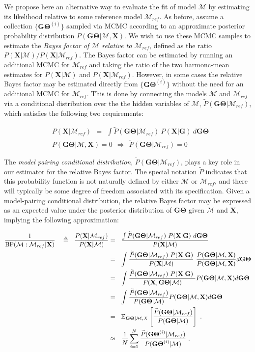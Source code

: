 \documentclass[11pt]{article}
\newcommand{\vect}[1]{\boldsymbol{\mathbf{#1}}}
\newcommand{\E}{\mathbb{E}}
\newcommand{\X}{\vect{X}}
\newcommand{\M}{\mathcal{M}}
\newcommand{\G}{\vect{G}}
\newcommand{\T}{\vect{\Theta}}
\newcommand{\GT}{\G\T}
\newcommand{\Mref}{\M_{ref}}
\newcommand{\Pref}{\widetilde{P}}
\newcommand{\rbf}{\text{BF}}
\newcommand{\1}{\mathbbm{1}}
\begin{document}
We propose here an alternative way to evaluate the fit of model $\M$ by estimating its likelihood relative to some
reference model $\Mref$. 
%
As before, assume a collection $\{\GT^{(i)}\}$ sampled via MCMC according to an approximate posterior probability distribution $P(\GT|\M,\X)$.
%
We wish to use these MCMC samples to estimate the {\em Bayes factor of $\M$ relative to $\Mref$}, defined as the ratio $P(\X|\M) / P(\X|\Mref)$.
%
The Bayes factor can be estimated by running an additional MCMC for $\Mref$ and taking the ratio of the two harmonc-mean estimates for $P(\X|\M)$ and $P(\X|\Mref)$.
%
However, in some cases the relative Bayes factor may be estimated directly from $\{\GT^{(i)}\}$ without the need for an additional MCMC for $\Mref$.
%
This is done by connecting the models $\M$ and $\Mref$ via a conditional distribution over the the hidden variables of $\M$, $\Pref(\GT|\Mref)$,
which satisfies the following two requirements:
%
%
\begin{small}
\begin{align}
&P(\X|\Mref) ~~=~~ \int  \Pref(\GT|\Mref)\ P(\X|\G)\ d\GT \label{eq:pref_integral}\\
&P(\GT|\M,\X)=0 ~~\Rightarrow~~ \Pref(\GT|\Mref)=0 \label{eq:pref_support}
\end{align}
\end{small}
%
%


The \emph{model pairing conditional distribution}, $\Pref(\GT|\Mref)$, plays a key role in our estimator for the relative Bayes factor.
%
The special notation $\Pref$ indicates that this probability function is not naturally defined by either
$\M$ or $\Mref$, and there will typically be some degree of freedom associated with its specification.
%
Given a model-pairing conditional distribution, the relative Bayes factor  may be expressed as an expected value under the posterior distribution of $\GT$ given $\M$ and $\X$,
implying the following approximation:
%
%
\begin{small}
\begin{align}
\frac{1}{\rbf(\M:\Mref|\X)} ~~~ \triangleq ~~ \frac{P(\X|\Mref)}{P(\X|\M)}
&=~~ \frac{\int  \Pref(\GT|\Mref)\ P(\X|\G)\ d\GT}{P(\X|\M)} \label{eq:pref1} \\ %
&=~~ \int \frac{\Pref(\GT|\Mref)\ P(\X|\G) }{P(\X|\M)} \ \frac{P(\GT|\M, \X)}{P(\GT|\M, \X)}  d\GT \label{eq:pref2} \\ %
&=~~ \int \frac{\Pref(\GT|\Mref)\ P(\X|\G)\ }{P(\X,\GT|\M)} P(\GT|\M, \X)  d\GT \notag \\ %
&=~~ \int \frac{\Pref(\GT|\Mref) }{P(\GT|\M)} P(\GT|\M, \X)  d\GT  \label{eq:data_cancel}\\ %
&=~~ \E_{\GT|\M,X } \left[\frac{\Pref(\GT|\Mref) }{P(\GT|\M)}\right]~.\notag \\
&\approx~~ \frac{1}{N} \sum_{i=1}^{N}\frac{\Pref(\GT^{(i)}|\Mref) }{P(\GT^{(i)}|\M)} ~.\label{eq:rbf}
\end{align}
\end{small}
%
%
\end{document}
